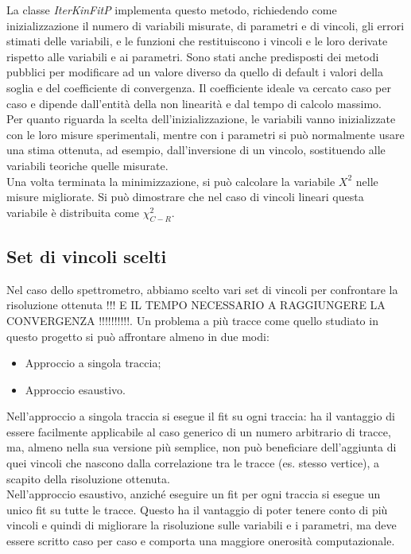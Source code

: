 \documentclass[8pt]{extarticle}
\begin{document}
La classe \textit{IterKinFitP} implementa questo metodo, richiedendo come inizializzazione il numero di variabili misurate, di parametri e di vincoli, gli errori stimati delle variabili, e le funzioni che restituiscono i vincoli e le loro derivate rispetto alle variabili e ai parametri. Sono stati anche predisposti dei metodi pubblici per modificare ad un valore diverso da quello di default i valori della soglia e del coefficiente di convergenza. Il coefficiente ideale va cercato caso per caso e dipende dall'entità della non linearità e dal tempo di calcolo massimo. \\

Per quanto riguarda la scelta dell'inizializzazione, le variabili vanno inizializzate con le loro misure sperimentali, mentre con i parametri si può normalmente usare una stima ottenuta, ad esempio, dall'inversione di un vincolo, sostituendo alle variabili teoriche quelle misurate. \\

Una volta terminata la minimizzazione, si può calcolare la variabile $X^2$ nelle misure migliorate. Si può dimostrare che nel caso di vincoli lineari questa variabile è distribuita come $\chi^2_{C-R}$. \\
\subsection{Set di vincoli scelti}
Nel caso dello spettrometro, abbiamo scelto vari set di vincoli per confrontare la risoluzione ottenuta !!! E IL TEMPO NECESSARIO A RAGGIUNGERE LA CONVERGENZA !!!!!!!!!!. Un problema a più tracce come quello studiato in questo progetto si può affrontare almeno in due modi:
\begin{itemize}
\item Approccio a singola traccia;
\item Approccio esaustivo.
\end{itemize}

Nell'approccio a singola traccia si esegue il fit su ogni traccia: ha il vantaggio di essere facilmente applicabile al caso generico di un numero arbitrario di tracce, ma, almeno nella sua versione più semplice, non può beneficiare dell'aggiunta di quei vincoli che nascono dalla correlazione tra le tracce (es. stesso vertice), a scapito della risoluzione ottenuta. \\
Nell'approccio esaustivo, anziché eseguire un fit per ogni traccia si esegue un unico fit su tutte le tracce. Questo ha il vantaggio di poter tenere conto di più vincoli e quindi di migliorare la risoluzione sulle variabili e i parametri, ma deve essere scritto caso per caso e comporta una maggiore onerosità computazionale. \medskip
\end{document}
